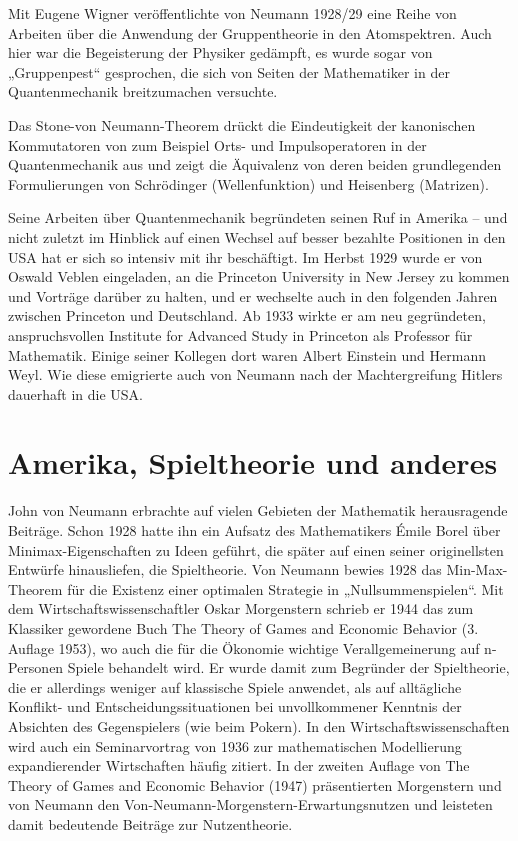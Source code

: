 Mit Eugene Wigner veröffentlichte von Neumann 1928/29 eine Reihe von Arbeiten über die Anwendung der Gruppentheorie in den Atomspektren. Auch hier war die Begeisterung der Physiker gedämpft, es wurde sogar von „Gruppenpest“ gesprochen, die sich von Seiten der Mathematiker in der Quantenmechanik breitzumachen versuchte.

Das Stone-von Neumann-Theorem drückt die Eindeutigkeit der kanonischen Kommutatoren von zum Beispiel Orts- und Impulsoperatoren in der Quantenmechanik aus und zeigt die Äquivalenz von deren beiden grundlegenden Formulierungen von Schrödinger (Wellenfunktion) und Heisenberg (Matrizen).

Seine Arbeiten über Quantenmechanik begründeten seinen Ruf in Amerika – und nicht zuletzt im Hinblick auf einen Wechsel auf besser bezahlte Positionen in den USA hat er sich so intensiv mit ihr beschäftigt. Im Herbst 1929 wurde er von Oswald Veblen eingeladen, an die Princeton University in New Jersey zu kommen und Vorträge darüber zu halten, und er wechselte auch in den folgenden Jahren zwischen Princeton und Deutschland. Ab 1933 wirkte er am neu gegründeten, anspruchsvollen Institute for Advanced Study in Princeton als Professor für Mathematik. Einige seiner Kollegen dort waren Albert Einstein und Hermann Weyl. Wie diese emigrierte auch von Neumann nach der Machtergreifung Hitlers dauerhaft in die USA.

\section{Amerika, Spieltheorie und anderes}

John von Neumann erbrachte auf vielen Gebieten der Mathematik herausragende Beiträge. Schon 1928 hatte ihn ein Aufsatz des Mathematikers Émile Borel über Minimax-Eigenschaften zu Ideen geführt, die später auf einen seiner originellsten Entwürfe hinausliefen, die Spieltheorie. Von Neumann bewies 1928 das Min-Max-Theorem für die Existenz einer optimalen Strategie in „Nullsummenspielen“. Mit dem Wirtschaftswissenschaftler Oskar Morgenstern schrieb er 1944 das zum Klassiker gewordene Buch The Theory of Games and Economic Behavior (3. Auflage 1953), wo auch die für die Ökonomie wichtige Verallgemeinerung auf n-Personen Spiele behandelt wird. Er wurde damit zum Begründer der Spieltheorie, die er allerdings weniger auf klassische Spiele anwendet, als auf alltägliche Konflikt- und Entscheidungssituationen bei unvollkommener Kenntnis der Absichten des Gegenspielers (wie beim Pokern). In den Wirtschaftswissenschaften wird auch ein Seminarvortrag von 1936 zur mathematischen Modellierung expandierender Wirtschaften häufig zitiert. In der zweiten Auflage von The Theory of Games and Economic Behavior (1947) präsentierten Morgenstern und von Neumann den Von-Neumann-Morgenstern-Erwartungsnutzen und leisteten damit bedeutende Beiträge zur Nutzentheorie.

